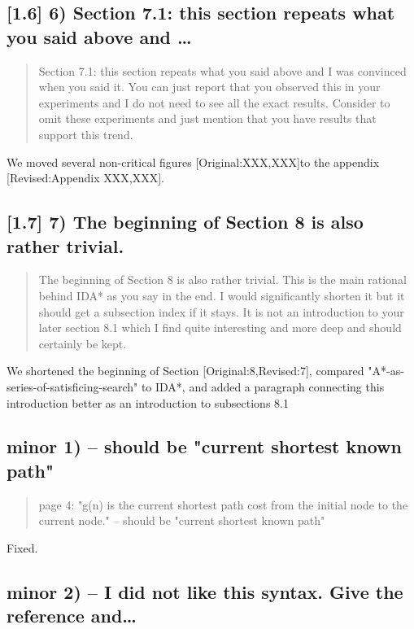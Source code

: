 \documentclass{article}
\begin{document}
\subsection{[1.6] 6) Section 7.1: this section repeats what you said above and \ldots{}}
\label{sec:orgheadline7}

\begin{quote}
Section 7.1: this section repeats what you said above and I was
convinced when you said it. You can just report that you observed this
in your experiments and I do not need to see all the exact results.
Consider to omit these experiments and just mention that you have
results that support this trend.
\end{quote}

We moved several non-critical figures [Original:XXX,XXX]to the appendix [Revised:Appendix XXX,XXX].

\subsection{[1.7] 7) The beginning of Section 8 is also rather trivial.}
\label{sec:orgheadline8}

\begin{quote}
The beginning of Section 8 is also rather trivial. This is the main
rational behind IDA* as you say in the end. I would significantly
shorten it but it should get a subsection index if it stays. It is not
an introduction to your later section 8.1 which I find quite
interesting and more deep and should certainly be kept.
\end{quote}

We shortened the beginning of Section [Original:8,Revised:7], compared "A*-as-series-of-satisficing-search" to IDA*, and added a paragraph connecting this introduction better as an introduction to  subsections 8.1



\subsection{minor 1) -- should be "current shortest known path"}
\label{sec:orgheadline9}

\begin{quote}
page 4: "g(n) is the current shortest path cost from the initial node
to the current node." -- should be "current shortest known path"
\end{quote}

Fixed.

\subsection{minor 2) -- I did not like this syntax. Give the reference and\ldots{}}
\label{sec:orgheadline10}
\end{document}
